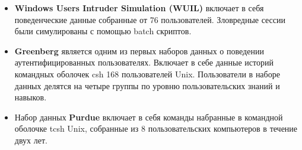 \begin{itemize}
\item \textbf{Windows Users Intruder Simulation (WUIL)} включает в себя поведенческие данные собранные от 76 пользователей. Зловредные сессии были симулированы с помощью batch скриптов.\\
\item \textbf{Greenberg} является одним из первых наборов данных о поведении аутентифицированных пользователях. Включает в себе данные историй командных оболочек csh 168 пользователей Unix. Пользователи в наборе данных делятся на четыре группы по уровню пользовательских знаний и навыков. \\
\item Набор данных \textbf{Purdue} включает в себя команды набранные в командной оболочке tcsh Unix, собранные из 8 пользовательских компьютеров в течение двух лет. \\
\end{itemize}
